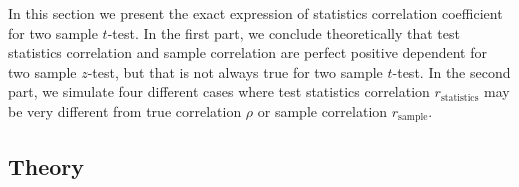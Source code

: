 \documentclass[12pt, a4paper]{article}
\begin{document}
	In this section we present the exact expression of statistics correlation coefficient for two
	sample $t$-test. In the first part, we conclude theoretically that test statistics correlation and
	sample correlation are perfect positive dependent for two sample $z$-test, but that is not always
	true for two sample $t$-test. In the second part, we simulate four different cases where test
	statistics correlation $r_{\text{statistics}}$ may be very different from true correlation $\rho$ or
	sample correlation $r_{\text{sample}}$. 
	\subsection{Theory}
	
\end{document}
